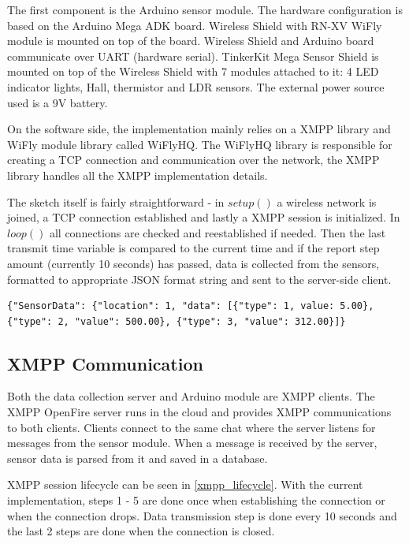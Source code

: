 The first component is the Arduino sensor module. The hardware configuration is based on the Arduino Mega ADK board. Wireless Shield with RN-XV WiFly module is mounted on top of the board. Wireless Shield and Arduino board communicate over UART (hardware serial). TinkerKit Mega Sensor Shield is mounted on top of the Wireless Shield with 7 modules attached to it: 4 LED indicator lights, Hall, thermistor and LDR sensors. The external power source used is a 9V battery.

On the software side, the implementation mainly relies on a XMPP library and WiFly module library called WiFlyHQ. The WiFlyHQ library is responsible for creating a TCP connection and communication over the network, the XMPP library handles all the XMPP implementation details. 

The sketch itself is fairly straightforward - in $setup()$ a wireless network is joined, a TCP connection established and lastly a XMPP session is initialized. In $loop()$ all connections are checked and reestablished if needed. Then the last transmit time variable is compared to the current time and if the report step amount (currently 10 seconds) has passed, data is collected from the sensors, formatted to appropriate JSON format string and sent to the server-side client. 

\begin{lstlisting}
{"SensorData": {"location": 1, "data": [{"type": 1, value: 5.00}, 
{"type": 2, "value": 500.00}, {"type": 3, "value": 312.00}]}
\end{lstlisting}

\subsection{XMPP Communication}

Both the data collection server and Arduino module are XMPP clients. The XMPP OpenFire server runs in the cloud and provides XMPP communications to both clients. Clients connect to the same chat where the server listens for messages from the sensor module. When a message is received by the server, sensor data is parsed from it and saved in a database.

XMPP session lifecycle can be seen in \autoref{xmpp_lifecycle}. With the current implementation, steps 1 - 5 are done once when establishing the connection or when the connection drops. Data transmission step is done every 10 seconds and the last 2 steps are done when the connection is closed.

